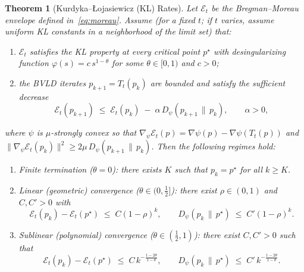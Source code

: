 \documentclass[11pt]{article}
\newcommand{\Ecal}{\mathcal{E}}
\theoremstyle{plain}
\newtheorem{theorem}{Theorem}[section]
\theoremstyle{definition}
\theoremstyle{remark}
\begin{document}
\begin{theorem}[Kurdyka--Łojasiewicz (KL) Rates]
\label{thm:kl}
Let $\Ecal_t$ be the Bregman--Moreau envelope defined in~\eqref{eq:moreau}.
Assume (for a fixed $t$; if $t$ varies, assume uniform KL constants in a neighborhood of the limit set) that:
\begin{enumerate}[leftmargin=1.2em, itemsep=2pt]
\item $\Ecal_t$ satisfies the KL property at every critical point $p^\star$ with desingularizing function $\varphi(s)=c\,s^{1-\theta}$ for some $\theta\in[0,1)$ and $c>0$;
\item the BVLD iterates $p_{k+1}=T_t(p_k)$ are bounded and satisfy the \emph{sufficient decrease}
\begin{equation}
\Ecal_t(p_{k+1}) \;\le\; \Ecal_t(p_k)\;-\;\alpha\,D_\psi(p_{k+1}\,\|\,p_k),
\qquad \alpha>0,
\label{eq:kl-SD}
\end{equation}
\end{enumerate}
where $\psi$ is $\mu$-strongly convex so that
$\nabla_{\!\psi}\Ecal_t(p)=\nabla\psi(p)-\nabla\psi(T_t(p))$ and
$\|\nabla_{\!\psi}\Ecal_t(p_k)\|^2\ge 2\mu\,D_\psi(p_{k+1}\,\|\,p_k)$.
Then the following regimes hold:
\begin{enumerate}[label=(\roman*), itemsep=2pt]
\item Finite termination ($\theta=0$): there exists $K$ such that $p_k=p^\star$ for all $k\ge K$.
\item Linear (geometric) convergence ($\theta\in(0,\tfrac12]$): there exist $\rho\in(0,1)$ and $C,C'>0$ with
\[
\Ecal_t(p_k)-\Ecal_t(p^\star) \;\le\; C(1-\rho)^k,
\qquad
D_\psi(p_k\,\|\,p^\star)\;\le\; C'(1-\rho)^k.
\]
\item Sublinear (polynomial) convergence ($\theta\in(\tfrac12,1)$): there exist $C,C'>0$ such that
\[
\Ecal_t(p_k)-\Ecal_t(p^\star)\;\le\; C\,k^{-\frac{1-2\theta}{1-\theta}},
\qquad
D_\psi(p_k\,\|\,p^\star)\;\le\; C'\,k^{-\frac{1-2\theta}{1-\theta}}.
\]
\end{enumerate}
\end{theorem}
\end{document}
